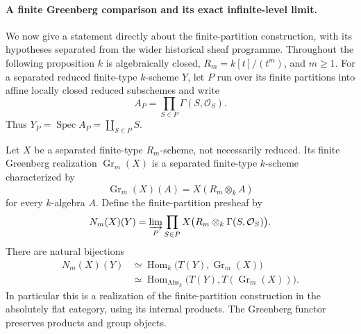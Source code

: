 \paragraph{A finite Greenberg comparison and its exact infinite-level limit.}
We now give a statement directly about the finite-partition construction,
with its hypotheses separated from the wider historical sheaf programme.
Throughout the following proposition $k$ is algebraically closed,
$R_m=k[t]/(t^m)$, and $m\geq1$.  For a separated reduced finite-type
$k$-scheme $Y$, let $P$ run over its finite partitions into affine locally
closed reduced subschemes and write
\[
 A_P=\prod_{S\in P}\Gamma(S,\mathcal O_S).
\]
Thus $Y_P=\operatorname{Spec}A_P=\coprod_{S\in P}S$.

\begin{proposition}\label{B:finite-Greenberg-piecewise}
Let $X$ be a separated finite-type $R_m$-scheme, not necessarily reduced.
Its finite Greenberg realization $\operatorname{Gr}_m(X)$ is a separated
finite-type $k$-scheme characterized by
\[
 \operatorname{Gr}_m(X)(A)=X(R_m\otimes_k A)
\]
for every $k$-algebra $A$.  Define the finite-partition presheaf by
\[
 N_m(X)(Y)=\varinjlim_P\prod_{S\in P}
 X\bigl(R_m\otimes_k\Gamma(S,\mathcal O_S)\bigr).
\]
There are natural bijections
\[
\begin{aligned}
 N_m(X)(Y)
 &\simeq\operatorname{Hom}_k\bigl(T(Y),\operatorname{Gr}_m(X)\bigr)\\
 &\simeq\operatorname{Hom}_{\operatorname{Abs}_k}
       \bigl(T(Y),T(\operatorname{Gr}_m(X))\bigr).
\end{aligned}
\]
In particular this is a realization of the finite-partition construction
in the absolutely flat category, using its internal products.
The Greenberg functor preserves products and group objects.
\end{proposition}

